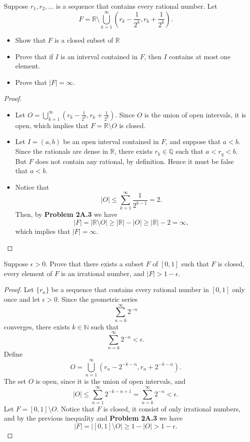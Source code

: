 \documentclass[14.5pt]{article}
\newcommand{\N}{\mathbb{N}}
\newcommand{\Q}{\mathbb{Q}}
\newcommand{\R}{\mathbb{R}}
\newenvironment{problem}[2][Problem]{\begin{mdframed}[backgroundcolor=gray!10, leftline = false, rightline=false, linewidth=0.25pt]  \begin{trivlist}
\item[\hskip \labelsep {\bfseries #1}\hskip \labelsep {\bfseries #2.}]}{\end{trivlist} \end{mdframed}  }
\begin{document}
\begin{problem}{2A.12}
    Suppose $r_1, r_2, \ldots$ is a sequence that contains every rational number. Let
$$F = \R \setminus \bigcup_{k=1}^\infty \left(r_k - \frac{1}{2^k}, r_k + \frac{1}{2^k} \right).$$
\begin{itemize}
    \item[(a)]Show that $F$ is a closed subset of $\R$
    \item[(b)]  Prove that if $I$ is an interval contained in $F$, then $I$ contains at most one element.
    \item[(c)] Prove that $|F| = \infty$.
\end{itemize}
\end{problem}
\begin{proof}
    \textbf{}
    \begin{itemize}
        \item[(a)] Let $O=\bigcup_{k=1}^\infty \left(r_k - \frac{1}{2^k}, r_k + \frac{1}{2^k} \right).$ Since $O$ is the union of open intervals, it is open, which implies that $F = \R \setminus O$ is closed. 
        \item[(b)] Let $I = (a,b)$ be an open interval contained in $F$, and suppose that $a < b$. Since the rationals are dense in $\R$, there exists $r_k\in \Q$ such that $a < r_q < b.$ But $F$ does not contain any rational, by definition. Hence it must be false that $a < b.$ 
        \item[(c)] Notice that 
        $$|O| \leq \sum_{k=1}^\infty \frac{1}{2^{k-1}} = 2.$$
        Then, by \textbf{Problem 2A.3} we have
        $$|F| = | \R \setminus O | \geq | \R | - | O | \geq  | \R | - 2 = \infty,$$
        which implies that $|F| = \infty.$
    \end{itemize}
\end{proof}

\begin{problem}{2A.13}
    Suppose $\epsilon > 0$. Prove that there exists a subset $F$ of $[0, 1]$ such that $F$ is closed, every element of $F$ is an irrational number, and $|F| > 1 - \epsilon$.
\end{problem}
\begin{proof}
    Let $\{r_n\}$ be a sequence that contains every rational number in $[0,1]$ only once and let $\epsilon > 0$. Since the geometric series
    $$\sum_{n=0}^{\infty}  2^{-n}$$
    converges, there exists $k\in \N$ such that
    $$\sum_{n=k}^{\infty}  2^{-n} < \epsilon.$$
    Define 
    $$O = \bigcup_{n=1}^\infty (r_n -  2^{-k-n}, r_n + 2^{-k-n}).$$
    The set $O$ is open, since it is the union of open intervals, and
    $$|O| \leq \sum_{n=1}^\infty 2^{-k-n+1}  = \sum_{n=k}^\infty 2^{-n} < \epsilon.$$
    Let $F = [0, 1] \setminus O$. Notice that $F$ is closed, it consist of only irrational numbers, and by the previous inequality and \textbf{Problem 2A.3} we have 
    $$|F| = |[0,1 ] \setminus O| \geq 1- |O| > 1 - \epsilon.$$
\end{proof}
\end{document}
